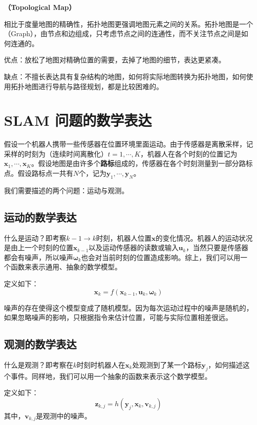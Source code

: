 \nob[2] \textbf{（Topological Map）}

相比于度量地图的精确性，拓扑地图更强调地图元素之间的关系。拓扑地图是一个（Graph），由节点和边组成，只考虑节点之间的连通性，而不关注节点之间是如何连通的。

优点：放松了地图对精确位置的需要，去掉了地图的细节，表达更紧凑。

缺点：不擅长表达具有复杂结构的地图，如何将实际地图转换为拓扑地图，如何使用拓扑地图进行导航与路径规划，都是比较困难的。



\section{SLAM 问题的数学表达}
假设一个机器人携带一些传感器在位置环境里面运动。由于传感器是离散采样，记采样的时刻为（连续时间离散化）$t = 1, \cdots ,K$，机器人在各个时刻的位置记为$\bm{x}_1 , \cdots, \bm{x}_K$。假设地图是由许多个\textbf{路标}组成的，传感器在各个时刻测量到一部分路标点。假设路标点一共有$N$个，记为$\bm{y}_1, \cdots, \bm{y}_N$。

我们需要描述的两个问题：运动与观测。

\subsection{运动的数学表达}
什么是运动？即考察$k-1 \to k$时刻，机器人位置$\bm{x}$的变化情况。机器人的运动状况是由上一个时刻的位置$\bm{x}_{k-1}$以及运动传感器的读数或输入$\bm{u}_k$，当然只要是传感器都会有噪声，所以噪声$\bm{\omega}_k$也会对当前时刻的位置造成影响。综上，我们可以用一个函数来表示通用、抽象的数学模型。

{
    定义如下：
    \begin{equation}
        \bm{x}_k = f(\bm{x}_{k-1}, \bm{u}_k, \bm{\omega}_k)
    \end{equation}
}

噪声的存在使得这个模型变成了随机模型。因为每次运动过程中的噪声是随机的，如果忽略噪声的影响，只根据指令来估计位置，可能与实际位置相差很远。

\subsection{观测的数学表达}
什么是观测？即考察在$k$时刻时机器人在$\bm{x}_k$处观测到了某一个路标$\bm{y}_j$，如何描述这个事件。同样地，我们可以用一个抽象的函数来表示这个数学模型。

{
    定义如下：
    \begin{equation}
        \bm{z}_{k,j} = h (\bm{y}_j, \bm{x}_k, \bm{v}_{k,j})
    \end{equation}
}
其中，$\bm{v}_{k,j}$是观测中的噪声。


